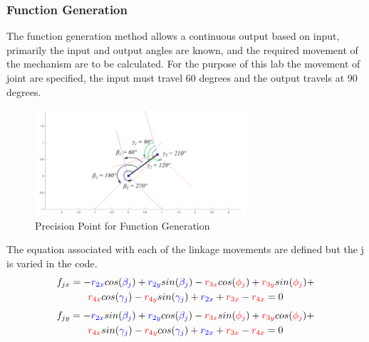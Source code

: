 \documentclass[12pt]{article}
\begin{document}
\subsubsection{Function Generation}
The function generation method allows a continuous output based on input, primarily the input and output angles are known, and the required movement of the mechanism are to be calculated. For the purpose of this lab the movement of joint are specified, the input must travel 60 degrees and the output travels at 90 degrees.
\begin{figure}[h!]
    \centering
    \includegraphics[width=0.7\textwidth]{func_gen.png}
    \caption{Precision Point for Function Generation}
    \label{fig:precisionpoint_FG}
\end{figure}
The equation associated with each of the linkage movements are defined but the j is varied in the code.
\begin{multline}
    f_{jx}=-\color{blue}r_{2x}\color{black}cos(\color{blue}\beta_j\color{black})+\color{blue}r_{2y}\color{black}sin(\color{blue}\beta_j\color{black})-\color{red}r_{3x}\color{black}cos(\color{red}\phi_{j}\color{black})+\color{red}r_{3y}\color{black}sin(\color{red}\phi_j\color{black})+\\\color{red}r_{4x}\color{black}cos(\color{blue}\gamma_{j}\color{black})-\color{red}r_{4y}\color{black}sin(\color{blue}\gamma_{j}\color{black})+\color{blue}r_{2x}\color{black}+\color{red}r_{3x}\color{black}-\color{red}r_{4x}\color{black}=0
\end{multline}
\begin{multline}
    f_{jy}=-\color{blue}r_{2x}\color{black}sin(\color{blue}\beta_j\color{black})+\color{blue}r_{2y}\color{black}cos(\color{blue}\beta_j\color{black})-\color{red}r_{3x}\color{black}sin(\color{red}\phi_{j}\color{black})+\color{red}r_{3y}\color{black}cos(\color{red}\phi_j\color{black})+\\\color{red}r_{4x}\color{black}sin(\color{blue}\gamma_{j}\color{black})-\color{red}r_{4y}\color{black}cos(\color{blue}\gamma_{j}\color{black})+\color{blue}r_{2x}\color{black}+\color{red}r_{3x}\color{black}-\color{red}r_{4x}\color{black}=0
\end{multline}
\pagebreak
\end{document}
